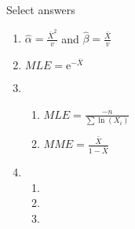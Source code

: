 \documentclass{article}
\newcommand{\e}{\mathrm{e}}		%
\begin{document}
Select answers\bigskip
\begin{enumerate}
    \item $\displaystyle \hat{\alpha} = \frac{\bar{X}^2}{v}$ and $\displaystyle \hat{\beta} = \frac{\bar{X}}{v}$
    
    \item $MLE = \e^{-\bar{X}}$
    
    \item 
    \begin{enumerate}
        \item $\displaystyle MLE = \frac{-n}{\sum \ln(X_i)}$
        \item $\displaystyle MME  = \frac{\bar{X}}{1 - \bar{X}}$
    \end{enumerate}
    
    \item
    \begin{enumerate}
        \item 
        \item 
        \item 
    \end{enumerate}    
                
\end{enumerate}
\end{document}
